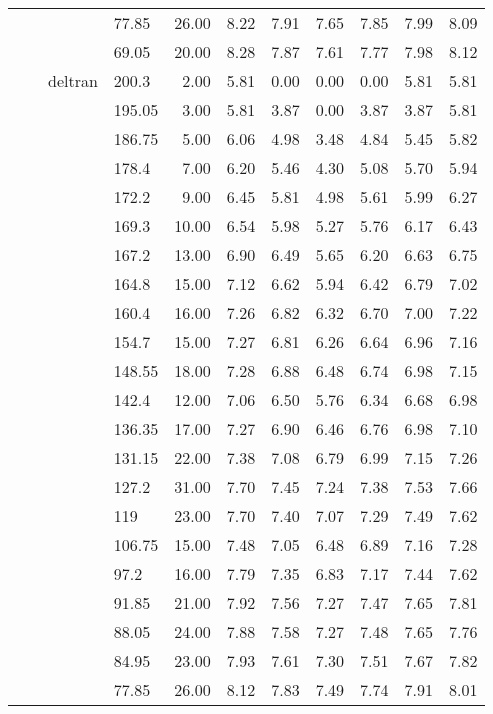 \begin{longtable}{llllrrrrrrr}
   &  &  & 77.85 & 26.00 & 8.22 & 7.91 & 7.65 & 7.85 & 7.99 & 8.09 \\ 
   &  &  & 69.05 & 20.00 & 8.28 & 7.87 & 7.61 & 7.77 & 7.98 & 8.12 \\ 
   &  & deltran & 200.3 & 2.00 & 5.81 & 0.00 & 0.00 & 0.00 & 5.81 & 5.81 \\ 
   &  &  & 195.05 & 3.00 & 5.81 & 3.87 & 0.00 & 3.87 & 3.87 & 5.81 \\ 
   &  &  & 186.75 & 5.00 & 6.06 & 4.98 & 3.48 & 4.84 & 5.45 & 5.82 \\ 
   &  &  & 178.4 & 7.00 & 6.20 & 5.46 & 4.30 & 5.08 & 5.70 & 5.94 \\ 
   &  &  & 172.2 & 9.00 & 6.45 & 5.81 & 4.98 & 5.61 & 5.99 & 6.27 \\ 
   &  &  & 169.3 & 10.00 & 6.54 & 5.98 & 5.27 & 5.76 & 6.17 & 6.43 \\ 
   &  &  & 167.2 & 13.00 & 6.90 & 6.49 & 5.65 & 6.20 & 6.63 & 6.75 \\ 
   &  &  & 164.8 & 15.00 & 7.12 & 6.62 & 5.94 & 6.42 & 6.79 & 7.02 \\ 
   &  &  & 160.4 & 16.00 & 7.26 & 6.82 & 6.32 & 6.70 & 7.00 & 7.22 \\ 
   &  &  & 154.7 & 15.00 & 7.27 & 6.81 & 6.26 & 6.64 & 6.96 & 7.16 \\ 
   &  &  & 148.55 & 18.00 & 7.28 & 6.88 & 6.48 & 6.74 & 6.98 & 7.15 \\ 
   &  &  & 142.4 & 12.00 & 7.06 & 6.50 & 5.76 & 6.34 & 6.68 & 6.98 \\ 
   &  &  & 136.35 & 17.00 & 7.27 & 6.90 & 6.46 & 6.76 & 6.98 & 7.10 \\ 
   &  &  & 131.15 & 22.00 & 7.38 & 7.08 & 6.79 & 6.99 & 7.15 & 7.26 \\ 
   &  &  & 127.2 & 31.00 & 7.70 & 7.45 & 7.24 & 7.38 & 7.53 & 7.66 \\ 
   &  &  & 119 & 23.00 & 7.70 & 7.40 & 7.07 & 7.29 & 7.49 & 7.62 \\ 
   &  &  & 106.75 & 15.00 & 7.48 & 7.05 & 6.48 & 6.89 & 7.16 & 7.28 \\ 
   &  &  & 97.2 & 16.00 & 7.79 & 7.35 & 6.83 & 7.17 & 7.44 & 7.62 \\ 
   &  &  & 91.85 & 21.00 & 7.92 & 7.56 & 7.27 & 7.47 & 7.65 & 7.81 \\ 
   &  &  & 88.05 & 24.00 & 7.88 & 7.58 & 7.27 & 7.48 & 7.65 & 7.76 \\ 
   &  &  & 84.95 & 23.00 & 7.93 & 7.61 & 7.30 & 7.51 & 7.67 & 7.82 \\ 
   &  &  & 77.85 & 26.00 & 8.12 & 7.83 & 7.49 & 7.74 & 7.91 & 8.01 \\ 

\end{longtable}
